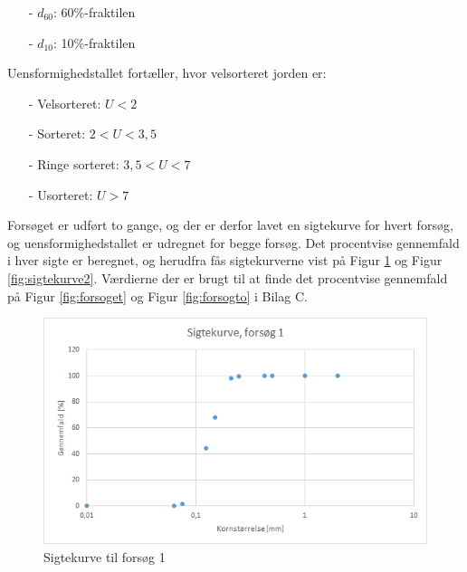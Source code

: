 \begin{itemize}
	\item[-] $d_{60}$: 60\%-fraktilen
	\item[-] $d_{10}$: 10\%-fraktilen
\end{itemize}

Uensformighedstallet fortæller, hvor velsorteret jorden er:
\begin{itemize}
	\item[-] Velsorteret: $U < 2$
	\item[-] Sorteret: $2 < U < 3,\!5$
	\item[-] Ringe sorteret: $3,\!5 < U < 7$
	\item[-] Usorteret: $U > 7$
\end{itemize}

Forsøget er udført to gange, og der er derfor lavet en sigtekurve for hvert forsøg, og uensformighedstallet er udregnet for begge forsøg. 
\newline \indent{     }  Det procentvise gennemfald i hver sigte er beregnet, og herudfra fås sigtekurverne vist på Figur \ref{fig:sigtekurve1} og Figur \ref{fig:sigtekurve2}. Værdierne der er brugt til at finde det procentvise gennemfald på Figur \ref{fig:forsoget} og Figur \ref{fig:forsogto} i Bilag C. 

\begin{figure}[htbp]
		\includegraphics[width=1.0\textwidth]{billeder/sigtekurve1.png}
		\caption{Sigtekurve til forsøg 1}
		\label{fig:sigtekurve1}
\end{figure}

